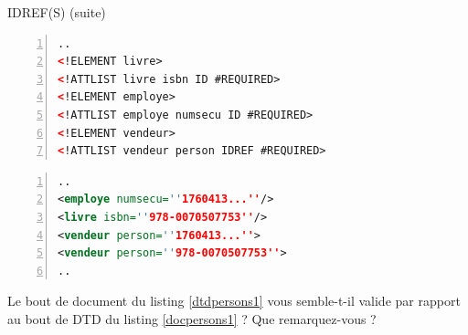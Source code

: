 \begin{frame}[containsverbatim]{IDREF(S) (suite)}
\begin{minipage}{0.7\textwidth}

\vspace{-0.5cm}
\begin{lstlisting}[basicstyle=\footnotesize, language=XML,breaklines=true,numbers=left, label={dtdpersons1}, caption={Bout de déclaration dans une DTD}]
..
<!ELEMENT livre>
<!ATTLIST livre isbn ID #REQUIRED>
<!ELEMENT employe>
<!ATTLIST employe numsecu ID #REQUIRED>
<!ELEMENT vendeur>
<!ATTLIST vendeur person IDREF #REQUIRED>
\end{lstlisting}
\end{minipage}

\vspace{-0.7cm}

\begin{flushright}
\begin{minipage}{0.5\textwidth}
\begin{lstlisting}[basicstyle=\footnotesize, language=XML,breaklines=true,numbers=left, label={docpersons1}, caption={Bout d'instance}]
..
<employe numsecu=''1760413...''/>
<livre isbn=''978-0070507753''/>
<vendeur person=''1760413...''>
<vendeur person=''978-0070507753''>
..
\end{lstlisting}
\end{minipage}
\end{flushright}
 
\vspace{-0.5cm}
\begin{exoblock}
Le bout de document du listing \ref{dtdpersons1}  vous semble-t-il valide par rapport au bout de DTD du listing \ref{docpersons1} ? Que remarquez-vous ?
\end{exoblock}

\end{frame}


